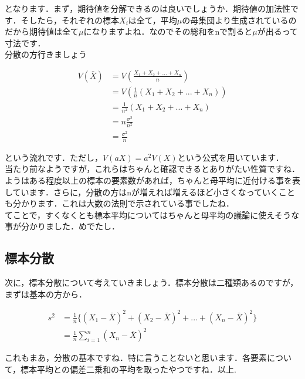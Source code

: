 \documentclass[11pt,a4paper,uplatex]{ujreport} 	%
\begin{document}
となります．まず，期待値を分解できるのは良いでしょうか．期待値の加法性です．そしたら，それぞれの標本$X_i$は全て，平均$\mu$の母集団より生成されているのだから期待値は全て$\mu$になりますよね．なのでその総和をnで割ると$\mu$が出るって寸法です．\\

分散の方行きましょう

\begin{align}
  V(\bar{X}) &= V(\frac{X_1+X_2+...+X_n}{n})\\
             &= V(\frac{1}{n}(X_1 + X_2 +...+ X_n)) \\
             &= \frac{1}{n^2}(X_1 + X_2+...+X_n)\\
             &= n\frac{\sigma^2}{n^2}\\
             &= \frac{\sigma^2}{n}
             \label{eq:hyohonvar1}
\end{align}

という流れです．ただし，$V(aX) = a^2 V(X)$という公式を用いています．\\



当たり前なようですが，これらはちゃんと確認できるとありがたい性質ですね．ようはある程度以上の標本の要素数があれば，ちゃんと母平均に近付ける事を表しています．さらに，分散の方はnが増えれば増えるほど小さくなっていくことも分かります．これは大数の法則で示されている事でしたね．\\

てことで，すくなくとも標本平均についてはちゃんと母平均の議論に使えそうな事が分かりました．めでたし．



\subsection{標本分散}
次に，標本分散について考えていきましょう．標本分散は二種類あるのですが，まずは基本の方から．

\begin{align}
  s^2 &= \frac{1}{n}\{ (X_1-\bar{X})^2 + (X_2-\bar{X})^2 + ...+(X_n - \bar{X})^2 \}\\
      &= \frac{1}{n} \sum_{i=1}^n(X_n - \bar{X})^2
      \label{eq:hyohonvar}
\end{align}

これもまあ，分散の基本ですね．特に言うことないと思います．各要素について，標本平均との偏差二乗和の平均を取ったやつですね．以上.\\
\\
\end{document}
